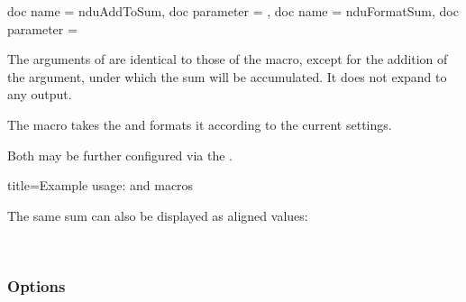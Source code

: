 \documentclass{article}
\begin{document}
\begin{docCommands}[]{
	{
		doc name = nduAddToSum,
		doc parameter = 
	},
	{
		doc name = nduFormatSum,
		doc parameter = 
	}
}

The arguments of  are identical to those of the  macro, except for the addition of the  argument, under which the sum will be accumulated. It does not expand to any output.

The  macro takes the  and formats it according to the current settings.

Both may be further configured via the .

\begin{dispExample*}{
	title=Example usage:  and  macros
}
\end{dispExample*}

The same sum can also be displayed as aligned values:

\begin{dispExample}
\\
\end{dispExample}
\end{docCommands}

\clearpage
\subsubsection{Options}
\end{document}
